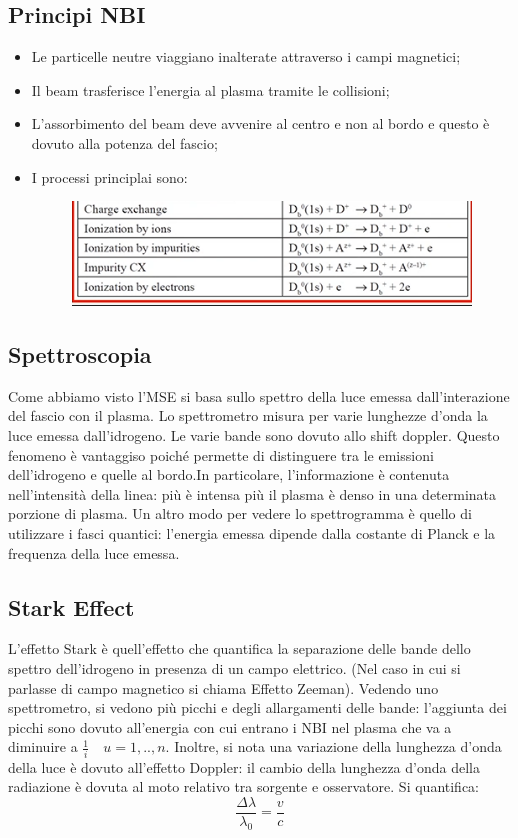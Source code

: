 \documentclass{article}
\begin{document}
\subsection{Principi NBI}
\begin{itemize}
    \item Le particelle neutre viaggiano inalterate attraverso i campi magnetici;
    \item Il beam trasferisce l'energia al plasma tramite le collisioni;
    \item L'assorbimento del beam deve avvenire al centro e non al bordo e questo è dovuto alla potenza del fascio;
    \item I processi principlai sono:\begin{figure}
        \includegraphics[scale=0.4]{2022-05-26-23-49-28.png}%
    \end{figure}
\end{itemize}
\subsection{Spettroscopia}
Come abbiamo visto l'MSE si basa sullo spettro della luce emessa dall'interazione del fascio con il plasma.\newline
Lo spettrometro misura per varie lunghezze d'onda la luce emessa dall'idrogeno. Le varie bande sono dovuto allo shift doppler. Questo fenomeno è vantaggiso poiché permette di distinguere tra le emissioni dell'idrogeno e quelle al bordo.\newline In particolare, l'informazione è contenuta nell'intensità della linea: più è intensa più il plasma è denso in una determinata porzione di plasma. Un altro modo per vedere lo spettrogramma è quello di utilizzare i fasci quantici: l'energia emessa dipende dalla costante di Planck e la frequenza della luce emessa.
\subsection{Stark Effect}
L'effetto Stark è quell'effetto che quantifica la separazione delle bande dello spettro dell'idrogeno in presenza di un campo elettrico. (Nel caso in cui si parlasse di campo magnetico si chiama Effetto Zeeman).\newline
Vedendo uno spettrometro, si vedono più picchi e degli allargamenti delle bande: l'aggiunta dei picchi sono dovuto all'energia con cui entrano i NBI nel plasma che va a diminuire a \(\frac{1}{i}\quad u=1,..,n\). Inoltre, si nota una variazione della lunghezza d'onda della luce è dovuto all'effetto Doppler: il cambio della lunghezza d'onda della radiazione è dovuta al moto relativo tra sorgente e osservatore. Si quantifica:
\begin{equation}
    \frac{\Delta\lambda}{\lambda_{0}}=\frac{v}{c}
\end{equation}
\end{document}
